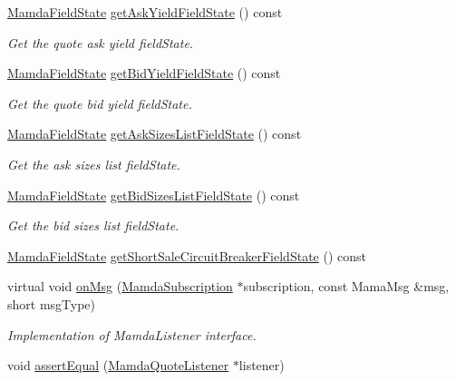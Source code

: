 \begin{CompactItemize}
\hyperlink{namespaceWombat_93aac974f2ab713554fd12a1fa3b7d2a}{Mamda\-Field\-State} \hyperlink{classWombat_1_1MamdaQuoteListener_94700f1e9995a69f5005efce5dc368d1}{get\-Ask\-Yield\-Field\-State} () const 
\begin{CompactList}\small\item\em Get the quote ask yield field\-State. \item\end{CompactList}\item 
\hyperlink{namespaceWombat_93aac974f2ab713554fd12a1fa3b7d2a}{Mamda\-Field\-State} \hyperlink{classWombat_1_1MamdaQuoteListener_fbf8ab1785c570733df4e0790947e489}{get\-Bid\-Yield\-Field\-State} () const 
\begin{CompactList}\small\item\em Get the quote bid yield field\-State. \item\end{CompactList}\item 
\hyperlink{namespaceWombat_93aac974f2ab713554fd12a1fa3b7d2a}{Mamda\-Field\-State} \hyperlink{classWombat_1_1MamdaQuoteListener_b943a6dc805ddb2d213d60539538d290}{get\-Ask\-Sizes\-List\-Field\-State} () const 
\begin{CompactList}\small\item\em Get the ask sizes list field\-State. \item\end{CompactList}\item 
\hyperlink{namespaceWombat_93aac974f2ab713554fd12a1fa3b7d2a}{Mamda\-Field\-State} \hyperlink{classWombat_1_1MamdaQuoteListener_1b8e1f6e95a20180b0f69df8fb9fdced}{get\-Bid\-Sizes\-List\-Field\-State} () const 
\begin{CompactList}\small\item\em Get the bid sizes list field\-State. \item\end{CompactList}\item 
\hyperlink{namespaceWombat_93aac974f2ab713554fd12a1fa3b7d2a}{Mamda\-Field\-State} \hyperlink{classWombat_1_1MamdaQuoteListener_741a0cdce0ceb5247ec54a883b265374}{get\-Short\-Sale\-Circuit\-Breaker\-Field\-State} () const 
\item 
virtual void \hyperlink{classWombat_1_1MamdaQuoteListener_ecb41b49b757309bc1738e23d087bd25}{on\-Msg} (\hyperlink{classWombat_1_1MamdaSubscription}{Mamda\-Subscription} $\ast$subscription, const Mama\-Msg \&msg, short msg\-Type)
\begin{CompactList}\small\item\em Implementation of Mamda\-Listener interface. \item\end{CompactList}\item 
void \hyperlink{classWombat_1_1MamdaQuoteListener_7d77206089991983a9fbaafc13be9cdf}{assert\-Equal} (\hyperlink{classWombat_1_1MamdaQuoteListener}{Mamda\-Quote\-Listener} $\ast$listener)
\end{CompactItemize}


